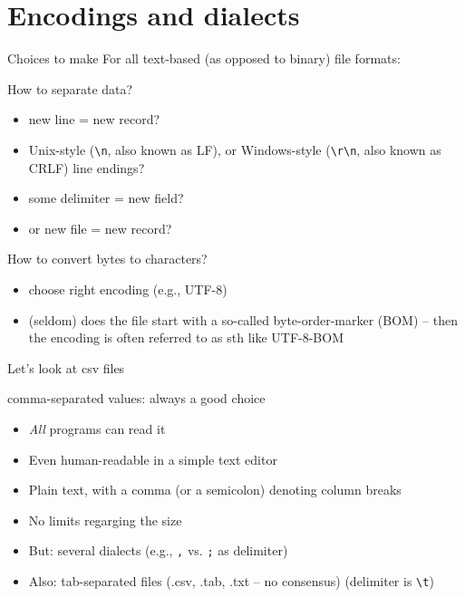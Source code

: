 \documentclass[compress]{beamer}
\begin{document}
\section{Encodings and dialects}


\begin{frame}{Choices to make}
For all text-based (as opposed to binary) file formats:
\begin{block}{How to separate data?}
	\begin{itemize}
		\item new line = new record?
		\item Unix-style (\texttt{\textbackslash n}, also known as LF),  or Windows-style (\texttt{\textbackslash r\textbackslash n}, also known as CRLF) line endings?
		\item some delimiter = new field?
		\item or new file = new record?
	\end{itemize}
\end{block}
\pause
\begin{block}{How to convert bytes to characters?}
	\begin{itemize}
		\item choose right encoding (e.g., UTF-8)
		\item (seldom) does the file start with a so-called byte-order-marker (BOM) -- then the encoding is often referred to as sth like UTF-8-BOM
	\end{itemize}
\end{block}
\end{frame}


\begin{frame}{Let's look at csv files}
	\begin{block}{comma-separated values: always a good choice}
		\begin{itemize}
			\item \emph{All} programs can read it
			\item Even human-readable in a simple text editor
			\item Plain text, with a comma (or a semicolon) denoting column breaks
			\item No limits regarging the size
			\item But: several dialects (e.g., \texttt{,} vs. \texttt{;} as delimiter)
			\item Also: tab-separated files (.csv, .tab, .txt -- no consensus) (delimiter is \texttt{\textbackslash t})
		\end{itemize}
	\end{block}
\end{frame}
\end{document}
